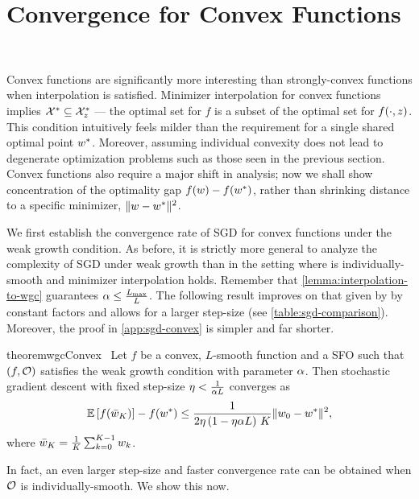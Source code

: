 \section{Convergence for Convex Functions}~\label{sec:sgd-convex}

Convex functions are significantly more interesting than strongly-convex functions when interpolation is satisfied. 
Minimizer interpolation for convex functions implies \( \calX^* \subseteq \calX^*_{\z} \) --- the optimal set for \( f \) is a subset of the optimal set for \( f(\cdot, \z) \).
This condition intuitively feels milder than the requirement for a single shared optimal point \( \wopt \). 
Moreover, assuming individual convexity does not lead to degenerate optimization problems such as those seen in the previous section.
Convex functions also require a major shift in analysis; now we shall show concentration of the optimality gap \( f(\w) - f(\wopt) \), rather than shrinking distance to a specific minimizer, \( \norm{\w - \wopt}^2 \).

We first establish the convergence rate of \ac{SGD} for convex functions under the weak growth condition. 
As before, it is strictly more general to analyze the complexity of \ac{SGD} under weak growth than in the setting where \oracle{} is individually-smooth and minimizer interpolation holds. 
Remember that \autoref{lemma:interpolation-to-wgc} guarantees \( \wgc \leq \frac{\Lmax}{L} \). 
The following result improves on that given by \citet{vaswani2019fast} by constant factors and allows for a larger step-size (see \autoref{table:sgd-comparison}).  
Moreover, the proof in \autoref{app:sgd-convex} is simpler and far shorter. 

\begin{restatable}{theorem}{wgcConvex}~\label{thm:wgc-convex}
    Let \( f \) be a convex, \( L \)-smooth function and \oracle{} a \ac{SFO} such that \( \rbr{f, \oracle{}} \) satisfies the weak growth condition with parameter \( \wgc \).
    Then stochastic gradient descent with fixed step-size \( \eta < \frac{1}{\wgc L} \) converges as
    \[ \E\sbr{\f(\bar \w_K)} - f(\wopt) \leq \frac{1}{2 \eta \rbr{1 - \eta \wgc L} \, K} \norm{\w_0 - \wopt}^2, \]
    where \( \bar \w_K = \frac{1}{K} \sum_{k=0}^{K-1} \wk \). 
\end{restatable}

\noindent In fact, an even larger step-size and faster convergence rate can be obtained when \( \oracle{} \) is individually-smooth.
We show this now.

